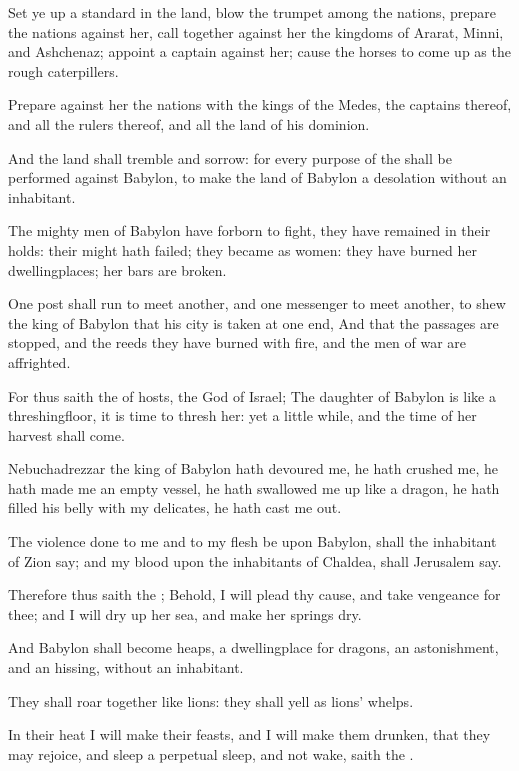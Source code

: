 \verse Set ye up a standard in the land, blow the trumpet among the nations, prepare the nations against her, call together against her the kingdoms of Ararat, Minni, and Ashchenaz; appoint a captain against her; cause the horses to come up as the rough caterpillers.

\verse Prepare against her the nations with the kings of the Medes, the captains thereof, and all the rulers thereof, and all the land of his dominion.

\verse And the land shall tremble and sorrow: for every purpose of the \LORD shall be performed against Babylon, to make the land of Babylon a desolation without an inhabitant.

\verse The mighty men of Babylon have forborn to fight, they have remained in their holds: their might hath failed; they became as women: they have burned her dwellingplaces; her bars are broken.

\verse One post shall run to meet another, and one messenger to meet another, to shew the king of Babylon that his city is taken at one end, \verse And that the passages are stopped, and the reeds they have burned with fire, and the men of war are affrighted.

\verse For thus saith the \LORD of hosts, the God of Israel; The daughter of Babylon is like a threshingfloor, it is time to thresh her: yet a little while, and the time of her harvest shall come.

\verse Nebuchadrezzar the king of Babylon hath devoured me, he hath crushed me, he hath made me an empty vessel, he hath swallowed me up like a dragon, he hath filled his belly with my delicates, he hath cast me out.

\verse The violence done to me and to my flesh be upon Babylon, shall the inhabitant of Zion say; and my blood upon the inhabitants of Chaldea, shall Jerusalem say.

\verse Therefore thus saith the \LORD; Behold, I will plead thy cause, and take vengeance for thee; and I will dry up her sea, and make her springs dry.

\verse And Babylon shall become heaps, a dwellingplace for dragons, an astonishment, and an hissing, without an inhabitant.

\verse They shall roar together like lions: they shall yell as lions' whelps.

\verse In their heat I will make their feasts, and I will make them drunken, that they may rejoice, and sleep a perpetual sleep, and not wake, saith the \LORD.

